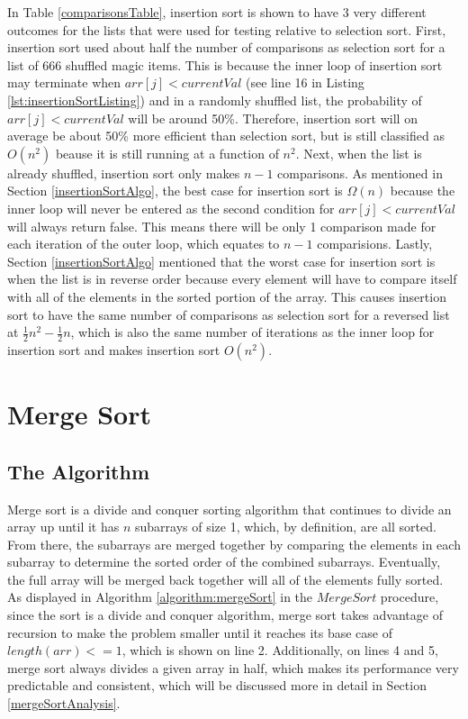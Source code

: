 \documentclass[letterpaper, 10pt,DIV=13]{scrartcl}
\numberwithin{equation}{section} %
\numberwithin{figure}{section} %
\numberwithin{table}{section} %
\begin{document}
In Table \ref{comparisonsTable}, insertion sort is shown to have 3 very different outcomes for the lists that were used for testing relative to selection sort. First, insertion sort used about half the number of comparisons as selection sort for a list of 666 shuffled magic items. This is because the inner loop of insertion sort may terminate when $arr[j] < currentVal$ (see line 16 in Listing \ref{lst:insertionSortListing}) and in a randomly shuffled list, the probability of $arr[j] < currentVal$ will be around 50\%. Therefore, insertion sort will on average be about 50\% more efficient than selection sort, but is still classified as $O(n^2)$ beause it is still running at a function of $n^2$. Next, when the list is already shuffled, insertion sort only makes $n-1$ comparisons. As mentioned in Section \ref{insertionSortAlgo}, the best case for insertion sort is $\Omega(n)$ because the inner loop will never be entered as the second condition for $arr[j] < currentVal$ will always return false. This means there will be only 1 comparison made for each iteration of the outer loop, which equates to $n - 1$ comparisions. Lastly, Section \ref{insertionSortAlgo} mentioned that the worst case for insertion sort is when the list is in reverse order because every element will have to compare itself with all of the elements in the sorted portion of the array. This causes insertion sort to have the same number of comparisons as selection sort for a reversed list at $\frac{1}{2}n^2 - \frac{1}{2}n$, which is also the same number of iterations as the inner loop for insertion sort and makes insertion sort $O(n^2)$.

\section{Merge Sort}
\subsection{The Algorithm}
Merge sort is a divide and conquer sorting algorithm that continues to divide an array up until it has $n$ subarrays of size 1, which, by definition, are all sorted. From there, the subarrays are merged together by comparing the elements in each subarray to determine the sorted order of the combined subarrays. Eventually, the full array will be merged back together will all of the elements fully sorted. As displayed in Algorithm \ref{algorithm:mergeSort} in the $MergeSort$ procedure, since the sort is a divide and conquer algorithm, merge sort takes advantage of recursion to make the problem smaller until it reaches its base case of $length(arr) <= 1$, which is shown on line 2. Additionally, on lines 4 and 5, merge sort always divides a given array in half, which makes its performance very predictable and consistent, which will be discussed more in detail in Section \ref{mergeSortAnalysis}.
\end{document}
